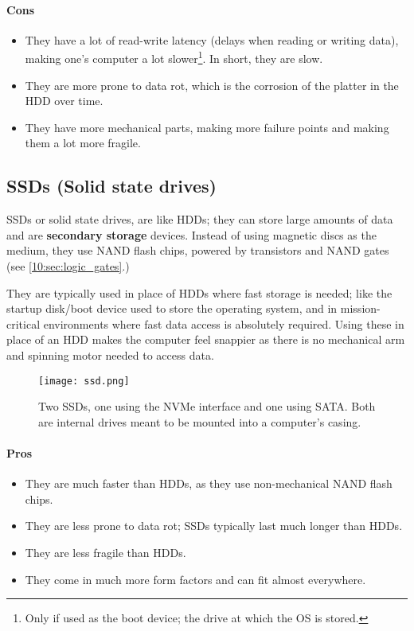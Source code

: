 \documentclass[../main.tex]{subfiles}
\begin{document}
\paragraph{Cons}
\begin{itemize}
    \item They have a lot of read-write latency (delays when reading or writing data), making one's computer a lot slower\footnote{Only if used as the boot device; the drive at which the OS is stored.}. In short, they are slow.
    \item They are more prone to data rot, which is the corrosion of the platter in the HDD over time.
    \item They have more mechanical parts, making more failure points and making them a lot more fragile.
\end{itemize}

\subsection{SSDs (Solid state drives)}

SSDs or solid state drives, are like HDDs; they can store large amounts of data and are \textbf{secondary storage} devices. Instead of using magnetic discs as the medium, they use NAND flash chips, powered by transistors and NAND gates (see \ref{10:sec:logic_gates}.)

They are typically used in place of HDDs where fast storage is needed; like the startup disk/boot device used to store the operating system, and in mission-critical environments where fast data access is absolutely required. Using these in place of an HDD makes the computer feel snappier as there is no mechanical arm and spinning motor needed to access data.

\begin{figure}[H]
    \centering
    \texttt{[image: ssd.png]}
    \caption{Two SSDs, one using the NVMe interface and one using SATA. Both are internal drives meant to be mounted into a computer's casing.}
    \label{fig:ssd}
\end{figure}

\paragraph{Pros}
\begin{itemize}
    \item They are much faster than HDDs, as they use non-mechanical NAND flash chips.
    \item They are less prone to data rot; SSDs typically last much longer than HDDs.
    \item They are less fragile than HDDs.
    \item They come in much more form factors and can fit almost everywhere.
\end{itemize}
\end{document}
